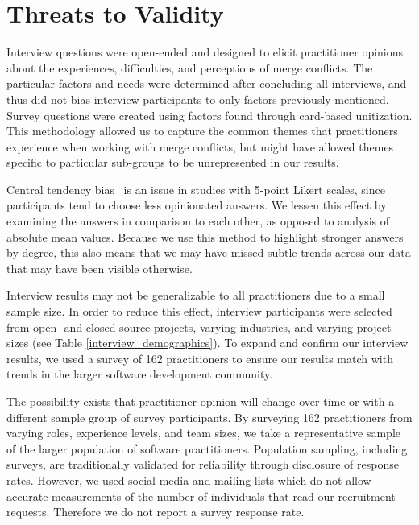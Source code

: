 \section{Threats to Validity}\label{threats}
Interview questions were open-ended and designed to elicit practitioner opinions about the experiences, difficulties, and perceptions of merge conflicts.
The particular factors and needs were determined after concluding all interviews, and thus did not bias interview participants to only factors previously mentioned.
Survey questions were created using factors found through card-based unitization.
This methodology allowed us to capture the common themes that practitioners experience when working with merge conflicts, but might have allowed themes specific to particular sub-groups to be unrepresented in our results.

Central tendency bias~\cite{guilford1954psychometric} is an issue in studies with 5-point Likert scales, since participants tend to choose less opinionated answers.
We lessen this effect by examining the answers in comparison to each other, as opposed to analysis of absolute mean values.
Because we use this method to highlight stronger answers by degree, this also means that we may have missed subtle trends across our data that may have been visible otherwise.

Interview results may not be generalizable to all practitioners due to a small sample size.
In order to reduce this effect, interview participants were selected from open- and closed-source projects, varying industries, and varying project sizes (see Table \ref{interview_demographics}).
To expand and confirm our interview results, we used a survey of 162 practitioners to ensure our results match with trends in the larger software development community.

The possibility exists that practitioner opinion will change over time or with a different sample group of survey participants.
By surveying 162 practitioners from varying roles, experience levels, and team sizes, we take a representative sample of the larger population of software practitioners.
Population sampling, including surveys, are traditionally validated for reliability through disclosure of response rates.
However, we used social media and mailing lists which do not allow accurate measurements of the number of individuals that read our recruitment requests.
Therefore we do not report a survey response rate.


